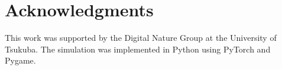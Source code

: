 \documentclass[10pt,twocolumn]{article}
\begin{document}
\section*{Acknowledgments}

This work was supported by the Digital Nature Group at the University of Tsukuba. The simulation was implemented in Python using PyTorch and Pygame.



\end{document}
